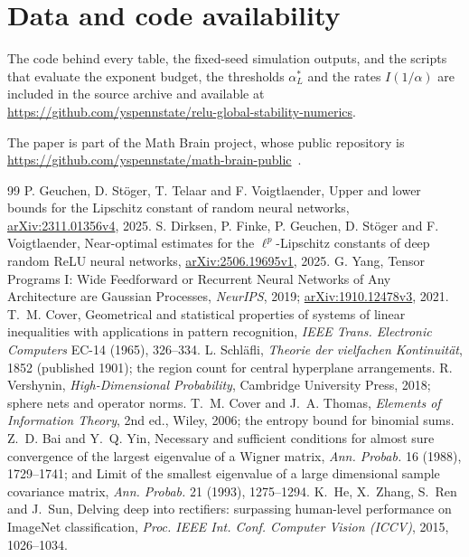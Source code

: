 \documentclass[11pt,a4paper]{article}
\theoremstyle{definition}
\theoremstyle{remark}
\begin{document}
\section*{Data and code availability}
The code behind every table, the fixed-seed simulation outputs, and the scripts that evaluate the exponent budget, the thresholds $\alpha^*_L$ and the rates $I(1/\alpha)$ are included in the source archive and available at \url{https://github.com/yspennstate/relu-global-stability-numerics}.

The paper is part of the Math Brain project, whose public repository is \url{https://github.com/yspennstate/math-brain-public}~\cite{MathBrainRepo}.

\begin{thebibliography}{99}
 P. Geuchen, D. St\"oger, T. Telaar and F. Voigtlaender, Upper and lower bounds for the Lipschitz constant of random neural networks, \href{https://arxiv.org/abs/2311.01356v4}{arXiv:2311.01356v4}, 2025.
 S. Dirksen, P. Finke, P. Geuchen, D. St\"oger and F. Voigtlaender, Near-optimal estimates for the $\ell^p$-Lipschitz constants of deep random ReLU neural networks, \href{https://arxiv.org/abs/2506.19695v1}{arXiv:2506.19695v1}, 2025.
 G. Yang, Tensor Programs I: Wide Feedforward or Recurrent Neural Networks of Any Architecture are Gaussian Processes, \emph{NeurIPS}, 2019; \href{https://arxiv.org/abs/1910.12478v3}{arXiv:1910.12478v3}, 2021.
 T.~M. Cover, Geometrical and statistical properties of systems of linear inequalities with applications in pattern recognition, \emph{IEEE Trans. Electronic Computers} EC-14 (1965), 326--334.
 L. Schl\"afli, \emph{Theorie der vielfachen Kontinuit\"at}, 1852 (published 1901); the region count for central hyperplane arrangements.
 R. Vershynin, \emph{High-Dimensional Probability}, Cambridge University Press, 2018; sphere nets and operator norms.
 T.~M. Cover and J.~A. Thomas, \emph{Elements of Information Theory}, 2nd ed., Wiley, 2006; the entropy bound for binomial sums.
 Z.~D. Bai and Y.~Q. Yin, Necessary and sufficient conditions for almost sure convergence of the largest eigenvalue of a Wigner matrix, \emph{Ann. Probab.} 16 (1988), 1729--1741; and Limit of the smallest eigenvalue of a large dimensional sample covariance matrix, \emph{Ann. Probab.} 21 (1993), 1275--1294.
 K.~He, X.~Zhang, S.~Ren and J.~Sun, Delving deep into rectifiers: surpassing human-level performance on ImageNet classification, \emph{Proc. IEEE Int. Conf. Computer Vision (ICCV)}, 2015, 1026--1034.

\end{thebibliography}
\end{document}
